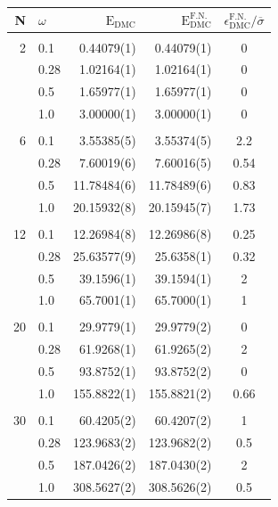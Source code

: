 \begin{table}
\begin{center}
\begin{tabular}{rl|rrc}
    N     & $\omega$ & $\mathrm{E_{DMC}}$ & $\mathrm{E_{DMC}^\mathrm{F.N.}}$  & $\epsilon_\mathrm{DMC}^\mathrm{F.N.}/\overline{\sigma}$ \\
\hline\hline
\multicolumn{5}{c}{} \\
    2     &   0.1    & 0.44079(1) & 0.44079(1)  & 0 \\
          &   0.28   & 1.02164(1) & 1.02164(1)  & 0 \\
          &   0.5    & 1.65977(1) & 1.65977(1)  & 0 \\
          &   1.0    & 3.00000(1) & 3.00000(1)  & 0 \\
\cline{2-5}
\multicolumn{5}{c}{} \\
    6     &   0.1    &  3.55385(5) & 3.55374(5) & 2.2  \\
          &   0.28   &  7.60019(6) & 7.60016(5) & 0.54 \\ 
          &   0.5    & 11.78484(6) & 11.78489(6)& 0.83 \\
          &   1.0    & 20.15932(8) & 20.15945(7)& 1.73 \\
\cline{2-5}
\multicolumn{5}{c}{} \\
    12    &   0.1    & 12.26984(8) & 12.26986(8)& 0.25\\
          &   0.28   & 25.63577(9) & 25.6358(1) & 0.32 \\
          &   0.5    & 39.1596(1) & 39.1594(1)  & 2 \\
          &   1.0    & 65.7001(1) & 65.7000(1)  & 1 \\
\cline{2-5}
\multicolumn{5}{c}{} \\
    20    &   0.1    &  29.9779(1) & 29.9779(2) & 0 \\
          &   0.28   &  61.9268(1) & 61.9265(2) & 2 \\
          &   0.5    &  93.8752(1) & 93.8752(2) & 0 \\
          &   1.0    & 155.8822(1) & 155.8821(2)& 0.66 \\
\cline{2-5}
\multicolumn{5}{c}{} \\
    30    &   0.1    &  60.4205(2) & 60.4207(2) & 1 \\
          &   0.28   & 123.9683(2) & 123.9682(2)& 0.5 \\
          &   0.5    & 187.0426(2) & 187.0430(2)& 2 \\
          &   1.0    & 308.5627(2) & 308.5626(2)& 0.5 \\

\end{tabular}
\end{center}
\end{table}
